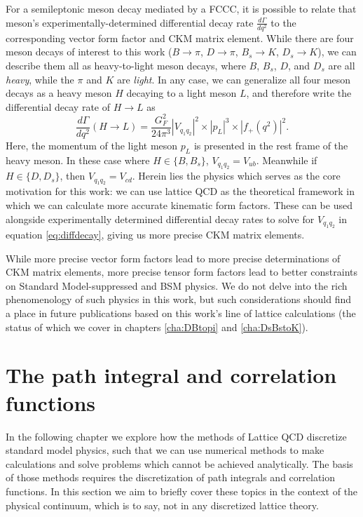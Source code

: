 For a semileptonic meson decay mediated by a FCCC, it is possible to relate that meson's experimentally-determined differential decay rate $\frac{d\Gamma}{dq^2}$ to the corresponding  vector form factor and CKM matrix element.  While there are four meson decays of interest to this work ($B\rightarrow\pi$, $D\rightarrow \pi$, $B_s \rightarrow K$, $D_s \rightarrow K$), we can describe them all as heavy-to-light meson decays, where $B$, $B_s$, $D$, and $D_s$ are all \textit{heavy}, while the $\pi$ and $K$ are \textit{light}.  %
In any case, we can generalize all four meson decays as a heavy meson $H$ decaying to a light meson $L$, and therefore write the differential decay rate of $H\rightarrow L$ as
\begin{equation}\label{eq:diffdecay}
    \frac{d\Gamma}{dq^2}(H\rightarrow L) = \frac{G_F^2}{24\pi^3}|V_{q_1q_2}|^2\times|p_{L}|^3\times|f_+(q^2)|^2.
\end{equation}
Here, the momentum of the light meson $p_L$ is presented in the rest frame of the heavy meson.  In these case where $H\in\{B,B_s\}$, $V_{q_1q_2} = V_{ub}$.  Meanwhile if $H\in\{D,D_s\}$, then $V_{q_1q_2} = V_{cd}$.  Herein lies the physics which serves as the core motivation for this work: we can use lattice QCD as the theoretical framework in which we can calculate more accurate kinematic form factors.  These can be used alongside experimentally determined differential decay rates to solve for $V_{q_1q_2}$ in equation \ref{eq:diffdecay}, giving us more precise CKM matrix elements.  

While more precise vector form factors lead to more precise determinations of CKM matrix elements, more precise tensor form factors lead to better constraints on Standard Model-suppressed and BSM physics.  We do not delve into the rich phenomenology of such physics in this work, but such considerations should find a place in future publications based on this work's line of lattice calculations (the status of which we cover in chapters \ref{cha:DBtopi} and \ref{cha:DsBstoK}).

\section{The path integral and correlation functions}\label{sec:path_integrals_and_corrfuncs}
In the following chapter we explore how the methods of Lattice QCD discretize standard model physics, such that we can use numerical methods to make calculations and solve problems which cannot be achieved analytically.  The basis of those methods requires the discretization of path integrals and correlation functions.  In this section we aim to briefly cover these topics in the context of the physical continuum, which is to say, not in any discretized lattice theory. 


